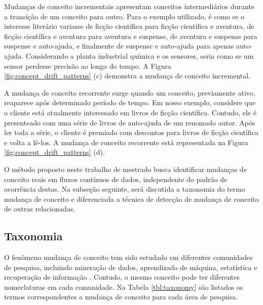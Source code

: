 \documentclass[qual, classic, a4paper]{ufbathesis}
\begin{document}
Mudanças de conceito incrementais apresentam conceitos intermediários durante a transição de um conceito para outro.
Para o exemplo utilizado, é como se o interesse literário variasse de ficção científica para ficção científica e aventura, 
de ficção científica e aventura para aventura e suspense, de aventura e suspense para suspense e auto-ajuda, e finalmente de suspense e auto-ajuda para apenas auto-ajuda.
Considerando a planta industrial química e os sensores, seria como se um sensor perdesse precisão ao longo do tempo. 
A Figura \ref{fig:concept_drift_patterns} (c) demonstra a mudança de conceito incremental. 

A mudança de conceito recorrente surge quando um conceito, previamente ativo, reaparece após determinado período de tempo.
Em nosso exemplo, considere que o cliente está atualmente interessado em livros de ficção científica.
Contudo, ele é presenteado com uma série de livros de auto-ajuda de um renomado autor.
Após ler toda a série, o cliente é premiado com descontos para livros de ficção científica e volta a lê-los.
A mudança de conceito recorrente está representada na Figura \ref{fig:concept_drift_patterns} (d).

O método proposto neste trabalho de mestrado busca identificar mudanças de conceito reais em fluxos contínuos de dados, independente do padrão de ocorrência destas.
Na subseção seguinte, será discutida a taxonomia do termo mudança de conceito e diferenciada a técnica de detecção de mudança de conceito de outras relacionadas.

\subsection{Taxonomia}

O fenômeno mudança de conceito tem sido estudado em diferentes comunidades de pesquisa, incluindo mineração de dados, 
aprendizado de máquina, estatística e recuperação de informação \cite{Zliobaite:2010}.
Contudo, o mesmo conceito pode ter diferentes nomeclaturas em cada comunidade.
Na Tabela \ref{tbl:taxonomy} são listados os termos correspondentes a mudança de conceito para cada área de pesquisa.
\end{document}

